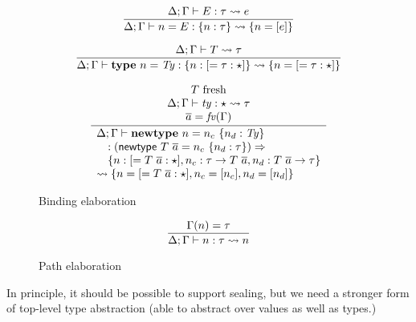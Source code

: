 \documentclass{article}
\begin{document}
\begin{figure}[H]

\[
\frac{
\Delta; \Gamma \vdash E : \tau \leadsto{} e
}{
\Delta; \Gamma \vdash n = E : \{ n : \tau \} \leadsto{} \{ n = [e] \}
}
\]

\[
\frac{
\Delta; \Gamma \vdash T \leadsto \tau
}{
\Delta; \Gamma \vdash \mathbf{type}~n = \mathit{Ty} : \{ n : [= \tau : \star] \} \leadsto{} \{ n = [= \tau : \star] \}
}
\]

\[
\frac{
\begin{array}{c}
T~\mbox{fresh} \\
\Delta; \Gamma \vdash \mathit{ty} : \star \leadsto \tau \\
\overline{a} = \mathit{fv}(\Gamma) \\
\end{array}
}{
\begin{array}{l}
\Delta; \Gamma \vdash \mathbf{newtype}~n = n_c~\{ n_d : \mathit{Ty} \} \\
\quad    : (\mathsf{newtype}~T~\overline{a} = n_c~\{ n_d : \tau \}) \Rightarrow \\
\quad    \{ n : [ = T~\overline{a} : \star ], n_c : \tau \rightarrow T~\overline{a} , n_d : T~\overline{a} \rightarrow \tau \} \\
\leadsto{} \{
n = [ = T~\overline{a} : \star ],
n_c = [ n_c ],
n_d = [ n_d ]
\} 
\end{array}
}
\]

\caption{Binding elaboration}
\end{figure}

\begin{figure}[H]

\[
\frac{
\Gamma(n) = \tau
}{
\Delta; \Gamma \vdash n : \tau \leadsto{} n
}
\]

\caption{Path elaboration}
\end{figure}

In principle, it should be possible to support sealing, but we need a stronger
form of top-level type abstraction (able to abstract over values as well as
types.)
\end{document}

